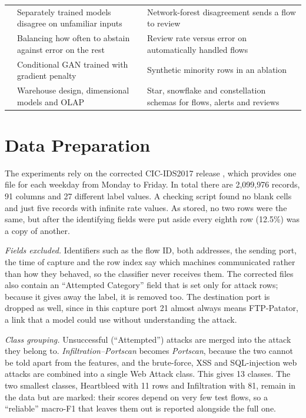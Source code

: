 \documentclass[conference]{IEEEtran}
\begin{document}
\begin{table}[t]
\begin{tabular}{p{1.6cm}p{6.9cm}p{8.35cm}}
\cite{lakshminarayanan2017simple} & Separately trained models disagree on unfamiliar inputs & Network-forest disagreement sends a flow to review \\
\cite{geifman2017selective} & Balancing how often to abstain against error on the rest & Review rate versus error on automatically handled flows \\
\cite{mirza2014conditional,gulrajani2017improved} & Conditional GAN trained with gradient penalty & Synthetic minority rows in an ablation \\
\cite{chaudhuri1997overview,kimball2013toolkit} & Warehouse design, dimensional models and OLAP & Star, snowflake and constellation schemas for flows, alerts and reviews \\
\bottomrule
\end{tabular}
\end{table}

\section{Data Preparation}
The experiments rely on the corrected CIC-IDS2017 release \cite{engelen2021troubleshooting,liu2022error},
which provides one file for each weekday from Monday to Friday. In total there are 2,099,976
records, 91 columns and 27 different label values. A checking script found no blank cells and just
five records with infinite rate values. As stored, no two rows were the same, but after the
identifying fields were put aside every eighth row (12.5\%) was a copy of another.

\textit{Fields excluded.} Identifiers such as the flow ID, both addresses, the sending port, the time of capture
and the row index say which machines communicated rather than how they behaved, so the classifier never
receives them. The corrected files also contain an ``Attempted Category'' field that is set only for
attack rows; because it gives away the label, it is removed too. The destination port is dropped as
well, since in this capture port 21 almost always means FTP-Patator, a link that a model could use
without understanding the attack.

\textit{Class grouping.} Unsuccessful (``Attempted'') attacks are merged into the attack they
belong to. \textit{Infiltration--Portscan} becomes \textit{Portscan}, because the two cannot be told
apart from the features, and the brute-force, XSS and SQL-injection web attacks are combined into a
single Web Attack class. This gives 13 classes. The two smallest classes, Heartbleed with 11 rows and Infiltration
with 81, remain in the data but are marked: their scores depend on very few test flows, so a
``reliable'' macro-F1 that leaves them out is reported alongside the full one.
\end{document}
